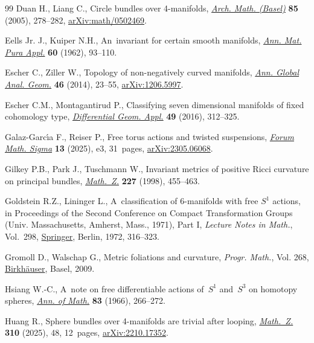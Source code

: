 \documentclass[10pt,a4paper]{amsart}
\numberwithin{equation}{section}
\theoremstyle{definition}
\numberwithin{table}{section}
\begin{document}
\begin{thebibliography}{99}
Duan H., Liang C., Circle bundles over 4-manifolds,
  \href{https://doi.org/10.1007/s00013-005-1214-4}{\textit{Arch. Math.
  (Basel)}} \textbf{85} (2005), 278--282,
  \href{https://arxiv.org/abs/math/0502469}{arXiv:math/0502469}.

Eells Jr. J., Kuiper N.H., An~invariant for certain smooth manifolds,
  \href{https://doi.org/10.1007/BF02412768}{\textit{Ann. Mat. Pura Appl.}}
  \textbf{60} (1962), 93--110.

Escher C., Ziller W., Topology of non-negatively curved manifolds,
  \href{https://doi.org/10.1007/s10455-013-9407-8}{\textit{Ann. Global Anal.
  Geom.}} \textbf{46} (2014), 23--55,
  \href{https://arxiv.org/abs/1206.5997}{arXiv:1206.5997}.

Escher C.M., Montagantirud P., Classifying seven dimensional manifolds of fixed
  cohomology type,
  \href{https://doi.org/10.1016/j.difgeo.2016.09.006}{\textit{Differential
  Geom. Appl.}} \textbf{49} (2016), 312--325.

Galaz-Garc\'{\i}a F., Reiser P., Free torus actions and twisted suspensions,
  \href{https://doi.org/10.1017/fms.2024.141}{\textit{Forum Math. Sigma}}
  \textbf{13} (2025), e3, 31~pages,
  \href{https://arxiv.org/abs/2305.06068}{arXiv:2305.06068}.

Gilkey P.B., Park J., Tuschmann W., Invariant metrics of positive {R}icci
  curvature on principal bundles,
  \href{https://doi.org/10.1007/PL00004385}{\textit{Math.~Z.}} \textbf{227}
  (1998), 455--463.

Goldstein R.Z., Lininger L., A~classification of {$6$}-manifolds with free
  {$S^1$} actions, in Proceedings of the {S}econd {C}onference on {C}ompact
  {T}ransformation {G}roups ({U}niv. {M}assachusetts, {A}mherst, {M}ass.,
  1971), {P}art {I}, \textit{Lecture Notes in Math.}, Vol.~298,
  \href{https://doi.org/10.1007/BFb0070052}{Springer}, Berlin, 1972, 316--323.

Gromoll D., Walschap G., Metric foliations and curvature, \textit{Progr.
  Math.}, Vol. 268,
  \href{https://doi.org/10.1007/978-3-7643-8715-0}{Birkh\"auser}, Basel, 2009.

Hsiang W.-C., A~note on free differentiable actions of~{$S^1$} and~{$S^{3}$} on
  homotopy spheres, \href{https://doi.org/10.2307/1970431}{\textit{Ann. of
  Math.}} \textbf{83} (1966), 266--272.

Huang R., Sphere bundles over 4-manifolds are trivial after looping,
  \href{https://doi.org/10.1007/s00209-025-03757-z}{\textit{Math.~Z.}}
  \textbf{310} (2025), 48, 12~pages,
  \href{https://arxiv.org/abs/2210.17352}{arXiv:2210.17352}.


\end{thebibliography}
\end{document}
